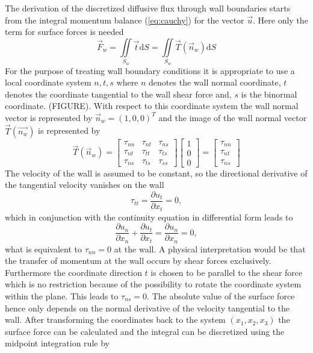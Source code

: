 The derivation of the discretized diffusive flux through wall boundaries starts from the integral momentum balance (\ref{eq:cauchy}) for the vector \(\vec{u}\). Here only the term for surface forces is needed
\begin{equation}
  \vec{F}_w =  \iint\limits_{S_w} \vec{t} \mathrm{d}S = \iint\limits_{S_w} \vec{T}(\vec{n}_w) \mathrm{d}S 
\end{equation}
For the purpose of treating wall boundary conditions it is appropriate to use a local coordinate system \(n,t,s\) where \(n\) denotes the wall normal coordinate, \(t\) denotes the coordinate tangential to the wall shear force and, \(s\) is the binormal coordinate. (FIGURE). With respect to this coordinate system the wall normal vector is represented by \(\vec{n}_w = \left( 1, 0 , 0 \right)^T\) and the image of the wall normal vector \(\vec{T}(\vec{n_w})\) is represented by 
\begin{displaymath}
\vec{T}(\vec{n}_w) =
\left[
  \begin{array}{ccc}
    \tau_{nn} & \tau_{nt} & \tau_{ns}\\
    \tau_{nt} & \tau_{tt} & \tau_{ts}\\
    \tau_{ns} & \tau_{ts} & \tau_{ss}
  \end{array}
\right]
\left[
\begin{array}{c}
  1\\
  0\\
  0
\end{array}
\right]
=
\left[
\begin{array}{c}
  \tau_{nn}\\
  \tau_{nt}\\
  \tau_{ns}
\end{array}
\right]
\end{displaymath}
The velocity of the wall is assumed to be constant, so the directional derivative of the tangential velocity vanishes on the wall
\begin{displaymath}
  \tau_{tt} =  \frac{ \partial u_t }{ \partial x_t }  =  0,
\end{displaymath}
which in conjunction with the continuity equation in differential form leads to
\begin{displaymath}
 \frac{ \partial u_n }{ \partial x_n } + \frac{ \partial u_t }{ \partial x_t } =  \frac{ \partial u_n }{ \partial x_n } = 0,
\end{displaymath}
what is equivalent to \( \tau_{nn} = 0\) at the wall. A physical interpretation would be that the transfer of momentum at the wall occurs by shear forces exclusively. Furthermore the coordinate direction \(t\) is chosen to be parallel to the shear force which is no restriction because of the possibility to rotate the coordinate system within the plane. This leads to \(\tau_{ns} = 0 \). The absolute value of the surface force hence only depends on the normal derivative of the velocity tangential to the wall. After transforming the coordinates back to the system \((x_1, x_2, x_3)\) the surface force can be calculated and the integral can be discretized using the midpoint integration rule by
